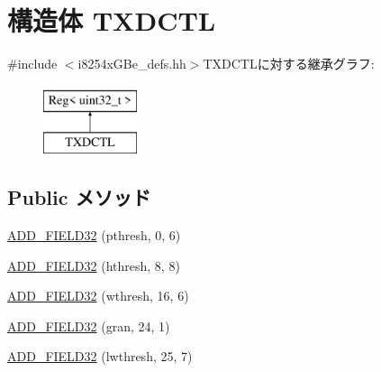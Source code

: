 \hypertarget{structiGbReg_1_1Regs_1_1TXDCTL}{
\section{構造体 TXDCTL}
\label{structiGbReg_1_1Regs_1_1TXDCTL}
}


{\ttfamily \#include $<$i8254xGBe\_\-defs.hh$>$}TXDCTLに対する継承グラフ:\begin{figure}[H]
\begin{center}
\leavevmode
\includegraphics[height=2cm]{structiGbReg_1_1Regs_1_1TXDCTL}
\end{center}
\end{figure}
\subsection*{Public メソッド}
\begin{DoxyCompactItemize}
\item 
\hyperlink{structiGbReg_1_1Regs_1_1TXDCTL_acca8f40dfe6ce58aac4678e3b089f191}{ADD\_\-FIELD32} (pthresh, 0, 6)
\item 
\hyperlink{structiGbReg_1_1Regs_1_1TXDCTL_a8107a874c1cce758418296e676ef49cf}{ADD\_\-FIELD32} (hthresh, 8, 8)
\item 
\hyperlink{structiGbReg_1_1Regs_1_1TXDCTL_a352305079deadad339f18b9f60b5791b}{ADD\_\-FIELD32} (wthresh, 16, 6)
\item 
\hyperlink{structiGbReg_1_1Regs_1_1TXDCTL_acdf2ad81a44f986c1547302a94bbfa34}{ADD\_\-FIELD32} (gran, 24, 1)
\item 
\hyperlink{structiGbReg_1_1Regs_1_1TXDCTL_a0609706ae3425a06cf231a18fce2db64}{ADD\_\-FIELD32} (lwthresh, 25, 7)
\end{DoxyCompactItemize}


